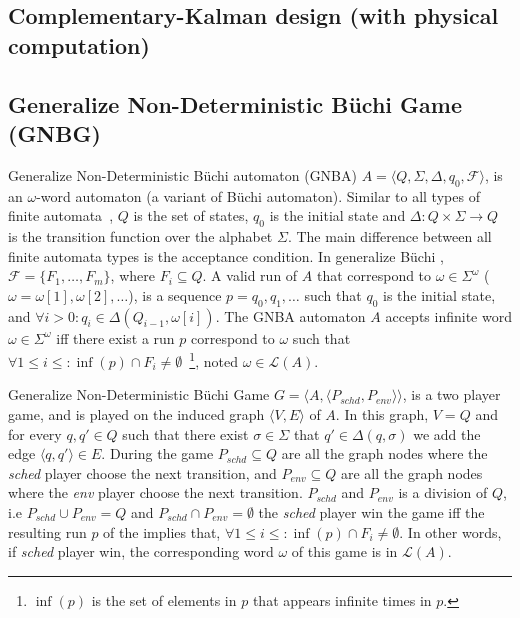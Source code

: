 \documentclass[ twoside, 12pt ]{article}
\newcommand{\buchi}{B\"uchi }
\begin{document}
\subsection{Complementary-Kalman design (with physical computation)}
\subsection{Generalize Non-Deterministic \buchi Game (GNBG)}
\label{sec:GNBG}

Generalize Non-Deterministic \buchi automaton (GNBA) $A= \langle Q,\Sigma,\Delta,q_0,\mathcal{F} \rangle $, is an $\omega$-word automaton (a variant of \buchi automaton).
Similar to all types of finite automata~\cite{???}, $Q$ is the set of states, $q_0$ is the initial state and $\Delta : Q \times \Sigma \xrightarrow{} Q$ is the transition function over the alphabet $\Sigma$.
The main difference between all finite automata types is the acceptance condition.
In generalize \buchi, $\mathcal{F} = \{ F_1 , \dots , F_m \}$, where $F_i \subseteq Q$.
A valid run of $A$ that correspond to $\omega \in \Sigma^\omega$ ($\omega = \omega[1], \omega[2], \dots$), is a sequence $p=q_0,q_1, \dots$ such that $q_0$ is the initial state, and $\forall i>0 : q_i \in \Delta(Q_{i-1}, \omega[i])$.
The GNBA automaton $A$ accepts infinite word $\omega \in \Sigma^\omega$ iff there exist a run $p$ correspond to $\omega$ such that $\forall 1 \le i \le : \inf(p) \cap F_i \neq \emptyset$~\footnote{$\inf(p)$ is the set of elements in $p$ that appears infinite times in $p$.}, noted $\omega \in \mathcal{L}(A)$.

Generalize Non-Deterministic \buchi Game $G=\langle A,\langle P_{schd}, P_{env}\rangle \rangle$, is a two player game, and is played on the induced graph $\langle V , E \rangle$ of $A$.
In this graph, $V=Q$ and for every $q, q' \in Q$ such that there exist $\sigma \in \Sigma$ that $q' \in \Delta(q,\sigma)$ we add the edge $\langle q,q' \rangle \in E$.
During the game $P_{schd} \subseteq Q$ are all the graph nodes where the \textit{sched} player choose the next transition, and $P_{env} \subseteq Q$ are all the graph nodes where the \textit{env} player choose the next transition.
$P_{schd}$ and $P_{env}$ is a division of $Q$, i.e $P_{schd} \cup P_{env} = Q$ and $P_{schd} \cap P_{env} = \emptyset$
the \textit{sched} player win the game iff the resulting run $p$ of the implies that, $\forall 1 \le i \le : \inf(p) \cap F_i \neq \emptyset$.
In other words, if \textit{sched} player win, the corresponding word $\omega$ of this game is in $\mathcal{L}(A)$.
\end{document}
